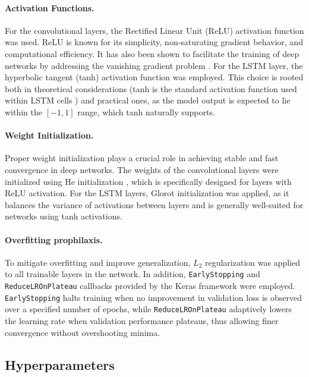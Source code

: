 \paragraph{Activation Functions.}
For the convolutional layers, the Rectified Linear Unit (ReLU) activation function was used. ReLU is known for its simplicity, non-saturating gradient behavior, and computational efficiency. It has also been shown to facilitate the training of deep networks by addressing the vanishing gradient problem \autocite{DBLP:journals/corr/abs-1803-08375}. For the LSTM layer, the hyperbolic tangent (tanh) activation function was employed. This choice is rooted both in theoretical considerations (tanh is the standard activation function used within LSTM cells \autocite{K20222637}) and practical ones, as the model output is expected to lie within the \([-1, 1]\) range, which tanh naturally supports.

\paragraph{Weight Initialization.}
Proper weight initialization plays a crucial role in achieving stable and fast convergence in deep networks. The weights of the convolutional layers were initialized using He initialization \autocite{he2015delving}, which is specifically designed for layers with ReLU activation. For the LSTM layers, Glorot initialization \autocite{glorot2010understanding} was applied, as it balances the variance of activations between layers and is generally well-suited for networks using tanh activations.

\paragraph{Overfitting prophilaxis.}
To mitigate overfitting and improve generalization, $L_2$ \autocite{kukačka2017regularizationdeeplearningtaxonomy} regularization was applied to all trainable layers in the network. In addition, \texttt{EarlyStopping} and \\ \texttt{ReduceLROnPlateau} callbacks provided by the Keras framework were employed. \texttt{EarlyStopping} halts training when no improvement in validation loss is observed over a specified number of epochs, while \texttt{ReduceLROnPlateau} adaptively lowers the learning rate when validation performance plateaus, thus allowing finer convergence without overshooting minima.

\subsection{Hyperparameters}
\label{sec:hyperparameters}

